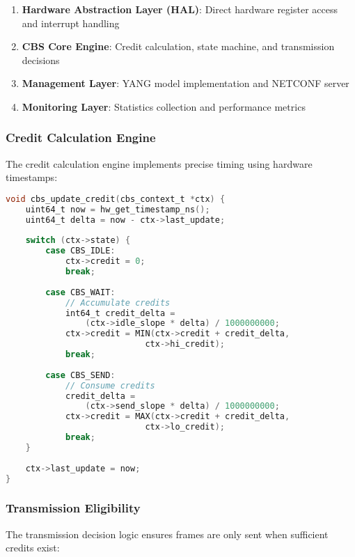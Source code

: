 \documentclass[10pt, journal, compsoc]{IEEEtran}
\begin{document}
\begin{enumerate}
    \item \textbf{Hardware Abstraction Layer (HAL)}: Direct hardware register access and interrupt handling
    \item \textbf{CBS Core Engine}: Credit calculation, state machine, and transmission decisions
    \item \textbf{Management Layer}: YANG model implementation and NETCONF server
    \item \textbf{Monitoring Layer}: Statistics collection and performance metrics
\end{enumerate}

\subsubsection{Credit Calculation Engine}

The credit calculation engine implements precise timing using hardware timestamps:

\begin{lstlisting}[language=C, caption=Credit Update Algorithm]
void cbs_update_credit(cbs_context_t *ctx) {
    uint64_t now = hw_get_timestamp_ns();
    uint64_t delta = now - ctx->last_update;
    
    switch (ctx->state) {
        case CBS_IDLE:
            ctx->credit = 0;
            break;
            
        case CBS_WAIT:
            // Accumulate credits
            int64_t credit_delta = 
                (ctx->idle_slope * delta) / 1000000000;
            ctx->credit = MIN(ctx->credit + credit_delta, 
                            ctx->hi_credit);
            break;
            
        case CBS_SEND:
            // Consume credits
            credit_delta = 
                (ctx->send_slope * delta) / 1000000000;
            ctx->credit = MAX(ctx->credit + credit_delta, 
                            ctx->lo_credit);
            break;
    }
    
    ctx->last_update = now;
}
\end{lstlisting}

\subsubsection{Transmission Eligibility}

The transmission decision logic ensures frames are only sent when sufficient credits exist:
\end{document}
